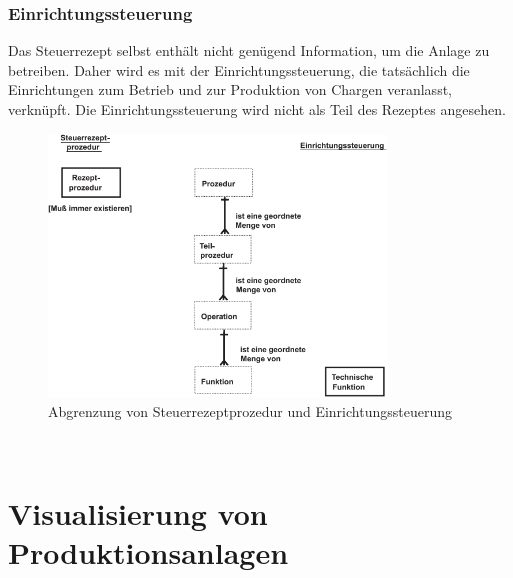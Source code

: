 \subsubsection{Einrichtungssteuerung}
Das Steuerrezept selbst enthält nicht genügend Information, um die Anlage zu betreiben. Daher wird es mit der Einrichtungssteuerung, die tatsächlich die Einrichtungen zum Betrieb und zur Produktion von Chargen veranlasst, verknüpft. Die Einrichtungssteuerung wird nicht als Teil des Rezeptes angesehen.
\begin{figure}[h!]
		\centering
		\includegraphics[width=0.8\textwidth]{graphics/stateoftheart/steuerrezeptprozedur_einrichtungssteuerung.png}
		\caption{Abgrenzung von Steuerrezeptprozedur und Einrichtungssteuerung}
\end{figure}
\\

\section{Visualisierung von Produktionsanlagen}

